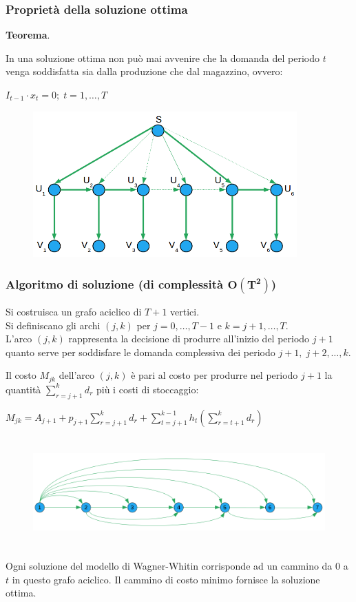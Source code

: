\subsubsection{Proprietà della soluzione ottima}
\textbf{Teorema}.

In una soluzione ottima non può mai avvenire che la domanda del periodo $t$ venga soddisfatta sia dalla produzione che dal magazzino, ovvero:
\begin{center}
	$I_{t-1}\cdot x_{t}=0;\;t=1,\dots,T$
\end{center}
\begin{figure}[H]
	\caption{}
	\centering
	\includegraphics[height=5.6cm]{images/graph4.png}
	\label{fig:PossibileSoluzione}
\end{figure}

\subsubsection{Algoritmo di soluzione (di complessità $\boldsymbol{O(T^{2})}$)}
Si costruisca un grafo aciclico di $T+1$ vertici.\\
Si definiscano gli archi $(j,k)$ per $j=0,\dots,T-1$ e $k=j+1,\dots,T$.\\
L'arco $(j,k)$ rappresenta la decisione di produrre all'inizio del periodo $j+1$ quanto serve per soddisfare le domanda complessiva dei periodo $j+1,\;j+2,\dots,k$.

Il costo $M_{jk}$ dell'arco $(j,k)$ è pari al costo per produrre nel periodo $j+1$ la quantità $\sum_{r=j+1}^{k}d_{r}$ più i costi di stoccaggio:
\begin{center}
	$M_{jk}=A_{j+1}+p_{j+1}\sum_{r=j+1}^{k}d_{r}+\sum_{t=j+1}^{k-1}h_{t}(\sum_{r=t+1}^{k}d_{r})$
\end{center}
\begin{figure}[H]
	\caption{}
	\centering
	\includegraphics[height=4.2cm]{images/graph5.png}
	\label{fig:PossibileSoluzione2}
\end{figure}

Ogni soluzione del modello di Wagner-Whitin corrisponde ad un cammino da $0$ a $t$ in questo grafo aciclico.\newline
Il cammino di costo minimo fornisce la soluzione ottima.